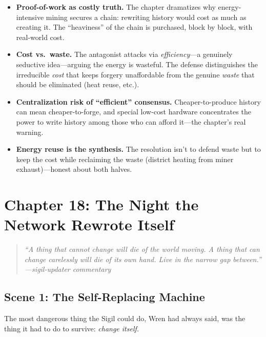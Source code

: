 \documentclass[12pt,letterpaper]{book}
\providecommand{\tightlist}{\setlength{\itemsep}{0pt}\setlength{\parskip}{0pt}}
\begin{document}
\begin{itemize}
\tightlist
\item
  \textbf{Proof-of-work as costly truth.} The chapter dramatizes why
  energy-intensive mining secures a chain: rewriting history would cost as much as
  creating it. The ``heaviness'' of the chain is purchased, block by block, with
  real-world cost.
\item
  \textbf{Cost vs.\ waste.} The antagonist attacks via \emph{efficiency}---a
  genuinely seductive idea---arguing the energy is wasteful. The defense
  distinguishes the irreducible \emph{cost} that keeps forgery unaffordable from
  the genuine \emph{waste} that should be eliminated (heat reuse, etc.).
\item
  \textbf{Centralization risk of ``efficient'' consensus.} Cheaper-to-produce
  history can mean cheaper-to-forge, and special low-cost hardware concentrates
  the power to write history among those who can afford it---the chapter's real
  warning.
\item
  \textbf{Energy reuse is the synthesis.} The resolution isn't to defend waste but
  to keep the cost while reclaiming the waste (district heating from miner
  exhaust)---honest about both halves.
\end{itemize}


\hypertarget{chapter-18-the-night-the-network-rewrote-itself}{%
\section{Chapter 18: The Night the Network Rewrote
Itself}\label{chapter-18-the-night-the-network-rewrote-itself}}

\begin{quote}
\itshape ``A thing that cannot change will die of the world moving. A thing that
can change carelessly will die of its own hand. Live in the narrow gap
between.''\\
\normalfont\hfill---sigil-updater commentary
\end{quote}

\hypertarget{scene-1-the-self-replacing-machine}{%
\subsection{Scene 1: The Self-Replacing
Machine}\label{scene-1-the-self-replacing-machine}}

The most dangerous thing the Sigil could do, Wren had always said, was the thing
it had to do to survive: \emph{change itself.}
\end{document}
